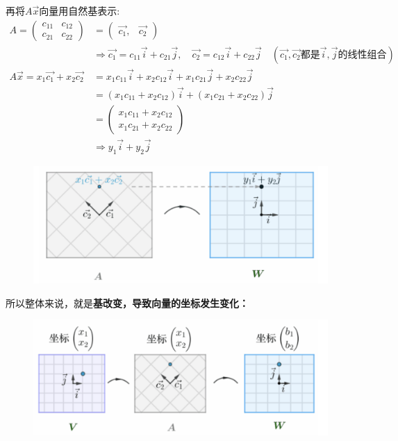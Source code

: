 \documentclass[12pt]{article}
\begin{document}
再将$A\vec{x}$向量用自然基表示:
\begin{align*}
A = 
\begin{pmatrix}c_{11} & c_{12} \\ c_{21} & c_{22}
\end{pmatrix} &= 
\begin{pmatrix}\vec{c_1}, & \vec{c_2}\end{pmatrix} \\
&\Rightarrow 
\vec{c_1} = c_{11}\vec{i} + c_{21}\vec{j}, \quad 
\vec{c_2} = c_{12}\vec{i} + c_{22}\vec{j} \quad (\vec{c_1},\vec{c_2}\textbf{都是}\vec{i},\vec{j}\text{的线性组合})\\
A\vec{x} = x_1\vec{c_1} + x_2\vec{c_2} &= 
x_1c_{11}\vec{i} + x_2c_{12}\vec{i} + x_1c_{21}\vec{j} + x_2c_{22}\vec{j} \\
&= (x_1c_{11} + x_2c_{12})\vec{i} + (x_1c_{21} + x_2c_{22})\vec{j} \\
&= 
\begin{pmatrix}
x_1c_{11} + x_2c_{12} \\
x_1c_{21} + x_2c_{22}
\end{pmatrix} \\
&\Rightarrow y_1\vec{i} + y_2\vec{j}
\end{align*}
\begin{figure}[H]
\centering
\includegraphics[width=.8\textwidth]{fig/UnderstandMatrixMultiplication_7.png}
\end{figure}

所以整体来说，就是\textbf{基改变，导致向量的坐标发生变化：}
\begin{figure}[H]
\centering
\includegraphics[width=.8\textwidth]{fig/UnderstandMatrixMultiplication_8.png}
\end{figure}
\end{document}
